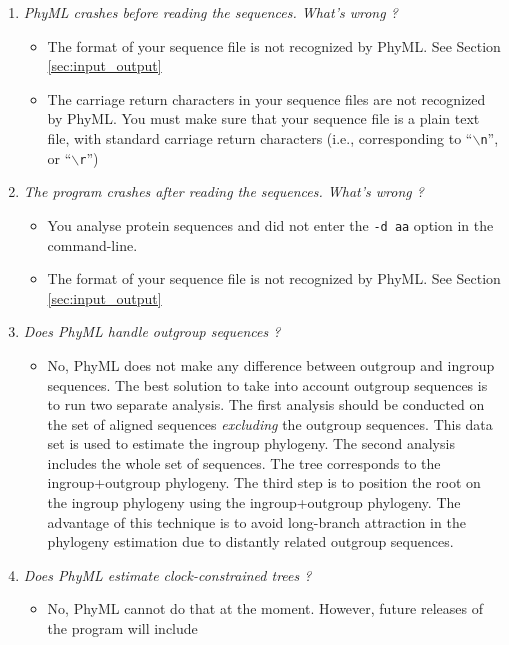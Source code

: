 \documentclass[a4paper,12pt]{article}
\newcommand{\x}[1]{\texttt{#1}}
\begin{document}
\begin{enumerate}
\item {\it PhyML crashes before reading the sequences. What's wrong ?}\\
\begin{itemize}
\item The format of your sequence file is not recognized by PhyML. See Section \ref{sec:input_output}
\item The carriage return characters in your sequence files are not recognized by PhyML. You must
  make sure that your sequence file is a plain text file, with standard carriage return characters (i.e.,
  corresponding to ``$\backslash$\x{n}'', or ``$\backslash$\x{r}'')
\end{itemize}
\item {\it The program crashes after reading the sequences. What's wrong ?}\\
\begin{itemize}
\item You analyse protein sequences and did not enter the \x{-d aa} option in the command-line.
\item The format of your sequence file is not recognized by PhyML. See Section \ref{sec:input_output}
\end{itemize}
\item {\it Does PhyML handle outgroup sequences ?}\\
\begin{itemize}
\item No,  PhyML does  not make  any difference between  outgroup and  ingroup sequences.   The best
solution to take into account outgroup sequences is to run two separate analysis. The first analysis
should be  conducted on the set  of aligned sequences  {\it excluding} the outgroup  sequences. This
data set is  used to estimate the ingroup  phylogeny. The second analysis includes the  whole set of
sequences. The tree corresponds to the ingroup+outgroup phylogeny. The third step is to position the
root on the ingroup phylogeny using  the ingroup+outgroup phylogeny. The advantage of this technique
is to  avoid long-branch attraction  in the phylogeny  estimation due to distantly  related outgroup
sequences.
\end{itemize}
\item {\it Does PhyML estimate clock-constrained trees ?}\\
\begin{itemize}
\item No, PhyML cannot  do that at the moment. However, future releases  of the program will include

\end{itemize}
\end{enumerate}
\end{document}
